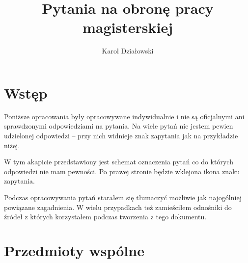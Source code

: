 \documentclass[wi]{zut}
\author{Karol Działowski}
\title{Pytania na obronę pracy magisterskiej}
\begin{document}
\maketitle
\tableofcontents

\section{Wstęp}

Poniższe opracowania były opracowywane indywidualnie i nie są oficjalnymi ani sprawdzonymi odpowiedziami na pytania. Na wiele pytań nie jestem pewien udzielonej odpowiedzi -- przy nich widnieje znak zapytania jak na przykładzie niżej.

W tym akapicie przedstawiony jest schemat oznaczenia pytań co do których odpowiedzi nie mam pewności. Po prawej stronie będzie wklejona ikona znaku zapytania.
\question

Podczas opracowywania pytań starałem się tłumaczyć możliwie jak najogólniej powiązane zagadnienia. W wielu przypadkach też zamieściłem odnośniki do źródeł z których korzystałem podczas tworzenia z tego dokumentu.

\section{Przedmioty wspólne}




\end{document}
